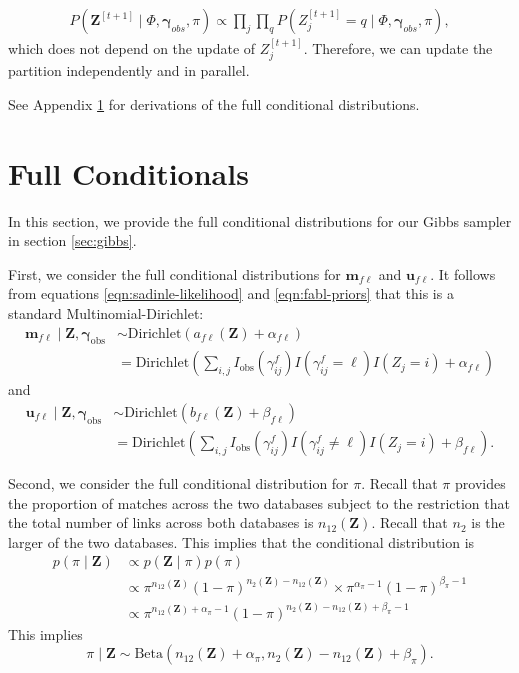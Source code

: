\documentclass[ba]{imsart}
\newcommand{\bem}{\boldsymbol{m}}
\newcommand{\bu}{\boldsymbol{u}}
\newcommand{\bZ}{\boldsymbol{Z}}
\newcommand{\bgamma}{\boldsymbol{\gamma}}
\begin{document}
\begin{align}
P(\bZ^{[t+1]}\mid \Phi, \bgamma_{obs}, \pi) \propto \prod_j  \prod_q
P(Z_{j}^{[t+1]} = q \mid \Phi, \bgamma_{obs}, \pi),
\end{align}
which does not depend on the update of $Z_{j}^{[t+1]}.$ Therefore, we can update the partition independently and in parallel. 

See Appendix \ref{app:full-conditional} for derivations of the full conditional distributions.

\newpage




\appendix

\section{Full Conditionals}
\label{app:full-conditional}

In this section, we provide the full conditional distributions for our Gibbs sampler in section \ref{sec:gibbs}. 

First, we consider the full conditional distributions for $\bem_{f\ell}$ and $\bu_{f\ell}.$
It follows from equations \ref{eqn:sadinle-likelihood} and \ref{eqn:fabl-priors} that this is a standard Multinomial-Dirichlet:
%
\begin{align}
\bem_{f\ell} \mid \bZ, \bgamma_{\text{obs}} &\sim \text{Dirichlet}(a_{f\ell}(\bZ) + \alpha_{f\ell})\\
&=  \text{Dirichlet}(\sum_{i,j} I_{\text{obs}}(\gamma_{ij}^f)I(\gamma_{ij}^f = \ell)I(Z_j = i) + \alpha_{f\ell})
\end{align}
and 
\begin{align}
\bu_{f\ell} \mid \bZ, \bgamma_{\text{obs}} &\sim \text{Dirichlet}(b_{f\ell}(\bZ) + \beta_{f\ell})\\
&=  \text{Dirichlet}(\sum_{i,j} I_{\text{obs}}(\gamma_{ij}^f)I(\gamma_{ij}^f \neq \ell)I(Z_j = i) + \beta_{f\ell}).
\end{align}

Second, we consider the full conditional distribution for $\pi.$ Recall that $\pi$ provides the proportion of matches across the two databases subject to the restriction that the total number of links across both databases is $n_{12} (\bZ).$ Recall that $n_2$ is the larger of the two databases. 
This implies that the conditional distribution is
\begin{align}
p(\pi \mid \bZ)& \propto p(\bZ \mid \pi) p(\pi) \\
& \propto \pi^{n_{12}(\bZ)} (1-\pi)^{n_2(\bZ) - n_{12}(\bZ)} \times \pi^{\alpha_\pi - 1} (1 - \pi)^{\beta_{\pi} - 1} \\
& \propto \pi^{n_{12}(\bZ) + \alpha_\pi - 1} (1-\pi)^{n_2(\bZ) - n_{12}(\bZ) + \beta_{\pi} - 1} 
\end{align}
This implies $$\pi \mid \bZ \sim \text{Beta}(n_{12}(\bZ) + \alpha_\pi , n_2(\bZ) - n_{12}(\bZ) + \beta_{\pi}).$$
\end{document}
